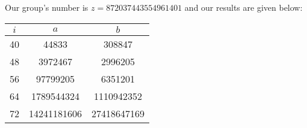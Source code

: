 \documentclass[psamsfonts]{amsart}
\begin{document}
Our group's number is $z = 872037443554961401$ and our results are given below:
\begin{table}[h!]
  \begin{tabular}{c | c c}
    $i$ & $a$ & $b$ \\
    \hline \hline
    40 & 44833 & 308847 \\
    48 & 3972467 & 2996205 \\
    56 & 97799205 & 6351201 \\
    64 & 1789544324 & 1110942352 \\
    72 & 14241181606 & 27418647169
  \end{tabular}
\end{table}
\end{document}
